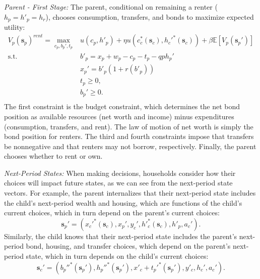 \documentclass[12pt]{article}
\newcommand{\E}{\mathbb{E}}
\begin{document}
\textit{Parent - First Stage:} The parent, conditional on remaining a renter ($h_p=h'_p=h_r$), chooses consumption, transfers, and bonds to maximize expected utility:
\begin{equation}\label{eq:Vp}
\begin{split}
V_p(\mathbf{s}_p)^{rent} = \max_{c_p,b_p',t_p} & u(c_p,h'_p) + {\eta} u\left (c_c^*({\mathbf{s}_c}),h_c'^*({\mathbf{s}_c})\right ) + \beta \E \left[V_{p}({\mathbf{s}_p'})\right] \\
\text{s.t.}\quad & b'_p = x_p + w_p - c_p - t_p - q p h_p'\\
& x_p' = b'_p(1+r(b'_p)) \\
& t_p\ge0, \\
& b_p'\ge 0. \\
\end{split}
\end{equation}
The first constraint is the budget constraint, which determines the net bond position as available resources (net worth and income) minus expenditures (consumption, transfers, and rent). The law of motion of net worth is simply the bond position for renters. The third and fourth constraints impose that transfers be nonnegative and that renters may not borrow, respectively. Finally, the parent chooses whether to rent or own.

\textit{Next-Period States:}
When making decisions, households consider how their choices will impact future states, as we can see from the next-period state vectors. For example, the parent internalizes that their next-period state includes the child's next-period wealth and housing, which are functions of the child's current choices, which in turn depend on the parent's current choices:
\begin{equation}
	\mathbf{s}_p' = \left(x_c'^{*}({\mathbf{s}_c}),x_p',y_c',h'^*_c({\mathbf{s}_c}),h'_p,a_c'\right).
\end{equation}
Similarly, the child knows that their next-period state includes the parent's next-period bond, housing, and transfer choices, which depend on the parent's next-period state, which in turn depends on the child's current choices:
\begin{equation}
	\mathbf{s}_c' = (b_p''^*({\mathbf{s}_p'}),h_p''^*({\mathbf{s}_p'}),x'_c + t_p'^*({\mathbf{s}_p'}),y'_c,h_c',a_c').
\end{equation}
	
\end{document}
